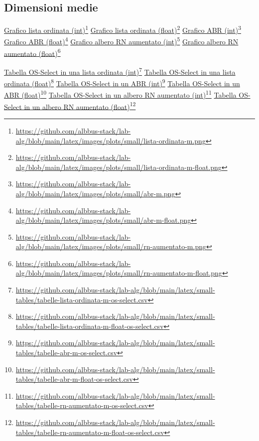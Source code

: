 \documentclass[onecolumn]{article}
\newcommand\anchor[2]{%
  \href{#2}{#1}\footnote{\url{#2}}%
}
\begin{document}
\newpage
\subsection{Dimensioni medie}

\anchor{Grafico lista ordinata (int)}{https://github.com/albbus-stack/lab-alg/blob/main/latex/images/plots/small/lista-ordinata-m.png} \label{label:lista-ordinata-m}
\newline
\anchor{Grafico lista ordinata (float)}{https://github.com/albbus-stack/lab-alg/blob/main/latex/images/plots/small/lista-ordinata-m-float.png} \label{label:lista-ordinata-m-float}
\newline
\anchor{Grafico ABR (int)}{https://github.com/albbus-stack/lab-alg/blob/main/latex/images/plots/small/abr-m.png} \label{label:abr-m}
\newline
\anchor{Grafico ABR (float)}{https://github.com/albbus-stack/lab-alg/blob/main/latex/images/plots/small/abr-m-float.png} \label{label:abr-m-float}
\newline
\anchor{Grafico albero RN aumentato (int)}{https://github.com/albbus-stack/lab-alg/blob/main/latex/images/plots/small/rn-aumentato-m.png} \label{label:rn-aumentato-m}
\newline
\anchor{Grafico albero RN aumentato (float)}{https://github.com/albbus-stack/lab-alg/blob/main/latex/images/plots/small/rn-aumentato-m-float.png} \label{label:rn-aumentato-m-float}

\newpage

\noindent
\anchor{Tabella OS-Select in una lista ordinata (int)}{https://github.com/albbus-stack/lab-alg/blob/main/latex/small-tables/tabelle-lista-ordinata-m-os-select.csv} \label{label:lista-ordinata-m-os-select}
\newline
\anchor{Tabella OS-Select in una lista ordinata (float)}{https://github.com/albbus-stack/lab-alg/blob/main/latex/small-tables/tabelle-lista-ordinata-m-float-os-select.csv} \label{label:lista-ordinata-m-float-os-select}
\newline
\anchor{Tabella OS-Select in un ABR (int)}{https://github.com/albbus-stack/lab-alg/blob/main/latex/small-tables/tabelle-abr-m-os-select.csv} \label{label:abr-m-os-select}
\newline
\anchor{Tabella OS-Select in un ABR (float)}{https://github.com/albbus-stack/lab-alg/blob/main/latex/small-tables/tabelle-abr-m-float-os-select.csv} \label{label:abr-m-float-os-select}
\newline
\anchor{Tabella OS-Select in un albero RN aumentato (int)}{https://github.com/albbus-stack/lab-alg/blob/main/latex/small-tables/tabelle-rn-aumentato-m-os-select.csv} \label{label:rn-aumentato-m-os-select}
\newline
\anchor{Tabella OS-Select in un albero RN aumentato (float)}{https://github.com/albbus-stack/lab-alg/blob/main/latex/small-tables/tabelle-rn-aumentato-m-float-os-select.csv} \label{label:rn-aumentato-m-float-os-select}
\end{document}
